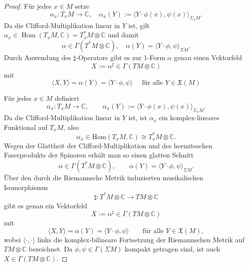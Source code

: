 \documentclass[10pt, letterpaper]{article}
\newcommand{\Hom}{\mathrm{Hom}}
\begin{document}
\begin{proof}
  Für jedes $x \in M$ setze
  $$
  \alpha_x: T_x M \rightarrow \mathbb{C}, \quad \alpha_x(Y):=\langle Y \cdot \phi(x), \psi(x)\rangle_{\Sigma_xM} .
  $$
  Da die Clifford-Multiplikation linear in $Y$ ist, gilt
  $\alpha_x \in \operatorname{Hom}\left(T_x M, \mathbb{C}\right)=T_x^* M \otimes \mathbb{C}$ und damit
  $$\alpha \in \Gamma(T^* M \otimes \mathbb{C}), \quad \alpha(Y)=\langle Y \cdot \phi, \psi\rangle_{\Sigma M}.$$
  Durch Anwendung des $\sharp$-Operators gibt es zur 1-Form $\alpha$ genau einen Vektorfeld
  $$
  X:=\alpha^{\sharp} \in \Gamma(T M \otimes \mathbb{C})
  $$
  mit
  $$
  \langle X,Y\rangle =\alpha(Y)=\langle Y \cdot \phi, \psi\rangle \quad \text { für alle } Y \in \mathfrak{X}(M)
  $$




  Für jedes $x\in M$ definiert
\[
\alpha_x:T_xM\to\mathbb C,\qquad
\alpha_x(Y):=\langle Y\cdot\phi(x),\psi(x)\rangle_{\Sigma_xM}.
\]
Da die Clifford-Multiplikation linear in $Y$ ist, ist $\alpha_x$ ein
komplex-lineares Funktional auf $T_xM$, also
\[
\alpha_x\in \Hom(T_xM,\mathbb C)\cong T_x^*M\otimes\mathbb C.
\]
Wegen der Glattheit der Clifford-Multiplikation und des hermiteschen
Faserprodukts der Spinoren erhält man so einen glatten Schnitt
\[
\alpha\in \Gamma(T^*M\otimes\mathbb C),\qquad
\alpha(Y)=\langle Y\cdot\phi,\psi\rangle_{\Sigma M}.
\]
Über den durch die Riemannsche Metrik induzierten musikalischen Isomorphismus
\[
\sharp:T^*M\otimes\mathbb C\to TM\otimes\mathbb C
\]
gibt es genau ein Vektorfeld
\[
X:=\alpha^\sharp\in \Gamma(TM\otimes\mathbb C)
\]
mit
\[
\langle X,Y\rangle=\alpha(Y)=\langle Y\cdot\phi,\psi\rangle
\qquad\text{für alle }Y\in \mathfrak X(M),
\]
wobei $\langle\cdot,\cdot\rangle$ links die komplex-bilineare Fortsetzung der
Riemannschen Metrik auf $TM\otimes\mathbb C$ bezeichnet.
Da $\phi,\psi\in \Gamma(\Sigma M)$ kompakt getragen sind, ist auch
$X\in \Gamma(TM\otimes\mathbb C)$.


\end{proof}
\end{document}
